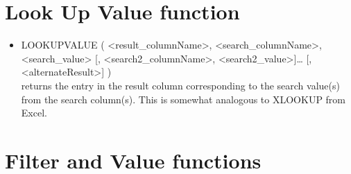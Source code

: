 \documentclass[10pt, openany, twocolumn]{book}
\begin{document}
\section{Look Up Value function}

\begin{itemize}
    \item LOOKUPVALUE (
    <result\_columnName>,
    <search\_columnName>,
    <search\_value>
    [, <search2\_columnName>, <search2\_value>]…
    [, <alternateResult>]
)\\returns the entry in the result column corresponding to the search value(s) from the search column(s). This is somewhat analogous to XLOOKUP from Excel.
\end{itemize}



\section{Filter and Value functions}
\end{document}
